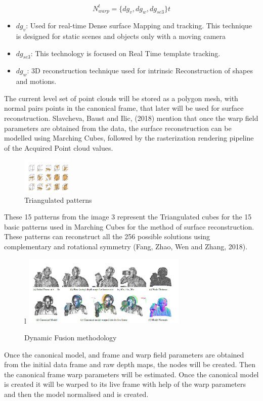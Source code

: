 \documentclass[a4paper]{article}
\begin{document}
\[N_{warp}^t=\{dg_v,dg_w,dg_{se3}\}t\]
\begin{itemize}[label =]
    \item $dg_{v}$: Used for real-time Dense surface Mapping and tracking. This technique is designed for static scenes and objects only with a moving camera
    \item $dg_{se3}$: This technology is focused on Real Time template tracking.
    \item $dg_{w}$: 3D reconstruction technique used for intrinsic Reconstruction of shapes and motions. 
\end{itemize}
The current level set of point clouds will be stored as a polygon mesh, with normal pairs points in the canonical frame, that later will be used for surface reconstruction.   
Slavcheva, Baust and Ilic, (2018)  mention that once the warp field parameters are obtained from the data, the surface reconstruction can be modelled using Marching Cubes, followed by the rasterization rendering pipeline of the Acquired Point cloud values.\\
\begin{figure} %
    \centering
    \includegraphics[width=0.21\textwidth]{shapes.png}
    \caption{Triangulated patterns \cite[]{fang_zhao_wen_zhang_2018}}
\end{figure}
These 15 patterns from the image 3 represent the Triangulated cubes for the 15 basic patterns used in Marching Cubes for the method of surface reconstruction. These patterns can reconstruct all the 256 possible solutions using complementary and rotational symmetry (Fang, Zhao, Wen and Zhang, 2018).
\begin{figure}{l} %
    \centering
    \includegraphics[width=0.7\textwidth]{dynamicfusion2.png}
    \caption{Dynamic Fusion methodology \cite[]{newcombe_fox_seitz_2015}}
\end{figure}
Once the canonical model, and frame and warp field parameters are obtained from the initial data frame and raw depth maps, the nodes will be created. Then the canonical frame warp parameters will be estimated. Once the canonical model is created it will be warped to its live frame with help of the warp parameters and then the model normalised and is created. \\
\enlargethispage{\baselineskip}
\end{document}
